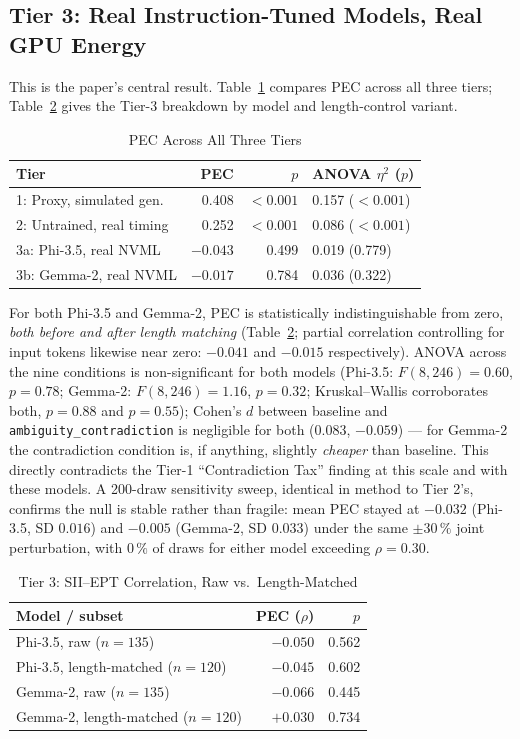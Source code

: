\documentclass[conference]{IEEEtran}
\begin{document}
\subsection{Tier 3: Real Instruction-Tuned Models, Real GPU Energy}
\label{sec:results-stage3}
This is the paper's central result. Table~\ref{tab:stage-summary}
compares PEC across all three tiers; Table~\ref{tab:real-pec} gives
the Tier-3 breakdown by model and length-control variant.
\begin{table}[t]
\caption{PEC Across All Three Tiers}
\label{tab:stage-summary}
\centering
\setlength{\tabcolsep}{3pt}
\begin{tabular}{@{}lrrl@{}}
\toprule
\textbf{Tier} & \textbf{PEC} & \textbf{$p$} & \textbf{ANOVA $\eta^2$ ($p$)} \\
\midrule
1: Proxy, simulated gen. & 0.408 & $<0.001$ & 0.157 ($<0.001$) \\
2: Untrained, real timing & 0.252 & $<0.001$ & 0.086 ($<0.001$) \\
3a: Phi-3.5, real NVML & $-0.043$ & 0.499 & 0.019 (0.779) \\
3b: Gemma-2, real NVML & $-0.017$ & 0.784 & 0.036 (0.322) \\
\bottomrule
\end{tabular}
\end{table}
For both Phi-3.5 and Gemma-2, PEC is statistically indistinguishable
from zero, \emph{both before and after length matching}
(Table~\ref{tab:real-pec}; partial correlation controlling for input
tokens likewise near zero: $-0.041$ and $-0.015$ respectively). ANOVA
across the nine conditions is non-significant for both models
(Phi-3.5: $F(8,246)=0.60$, $p=0.78$; Gemma-2: $F(8,246)=1.16$,
$p=0.32$; Kruskal--Wallis corroborates both, $p=0.88$ and $p=0.55$);
Cohen's $d$ between baseline and \texttt{ambiguity\_contradiction} is
negligible for both ($0.083$, $-0.059$) --- for Gemma-2 the
contradiction condition is, if anything, slightly \emph{cheaper} than
baseline. This directly contradicts the Tier-1 ``Contradiction Tax''
finding at this scale and with these models. A 200-draw sensitivity
sweep, identical in method to Tier 2's, confirms the null is stable
rather than fragile: mean PEC stayed at $-0.032$ (Phi-3.5, SD
$0.016$) and $-0.005$ (Gemma-2, SD $0.033$) under the same
$\pm30\,\%$ joint perturbation, with $0\,\%$ of draws for either model
exceeding $\rho=0.30$.
\begin{table}[t]
\caption{Tier 3: SII--EPT Correlation, Raw vs.\ Length-Matched}
\label{tab:real-pec}
\centering
\setlength{\tabcolsep}{3pt}
\begin{tabular}{@{}lrr@{}}
\toprule
\textbf{Model / subset} & \textbf{PEC ($\rho$)} & \textbf{$p$} \\
\midrule
Phi-3.5, raw ($n=135$) & $-0.050$ & 0.562 \\
Phi-3.5, length-matched ($n=120$) & $-0.045$ & 0.602 \\
Gemma-2, raw ($n=135$) & $-0.066$ & 0.445 \\
Gemma-2, length-matched ($n=120$) & $+0.030$ & 0.734 \\
\bottomrule
\end{tabular}
\end{table}
\end{document}
